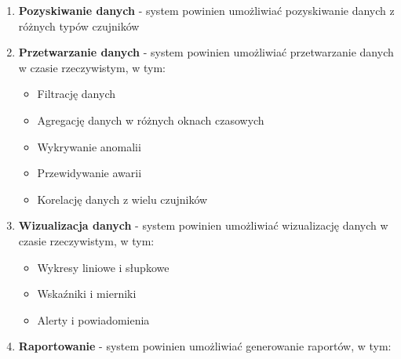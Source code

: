 \begin{enumerate}
    \item \textbf{Pozyskiwanie danych} - system powinien umożliwiać pozyskiwanie danych z różnych typów czujników
    
    \item \textbf{Przetwarzanie danych} - system powinien umożliwiać przetwarzanie danych w czasie rzeczywistym, w tym:
    \begin{itemize}
        \item Filtrację danych
        \item Agregację danych w różnych oknach czasowych
        \item Wykrywanie anomalii
        \item Przewidywanie awarii
        \item Korelację danych z wielu czujników
    \end{itemize}
    
    \item \textbf{Wizualizacja danych} - system powinien umożliwiać wizualizację danych w czasie rzeczywistym, w tym:
    \begin{itemize}
        \item Wykresy liniowe i słupkowe
        \item Wskaźniki i mierniki
        \item Alerty i powiadomienia
    \end{itemize}
    
    
    \item \textbf{Raportowanie} - system powinien umożliwiać generowanie raportów, w tym:
\end{enumerate}

